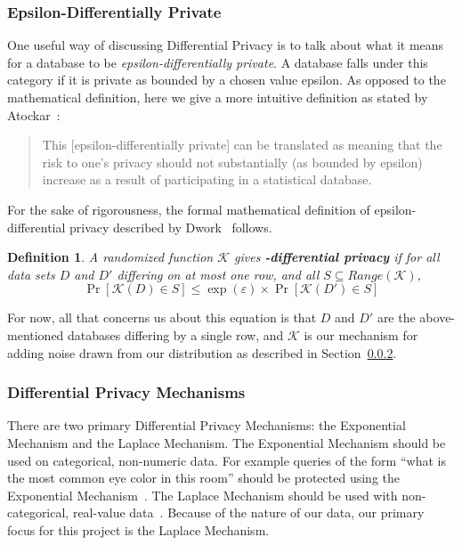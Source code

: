 \documentclass[conference,11pt]{IEEEtran}
\newtheorem{definition}{Definition}
\begin{document}
\subsubsection{Epsilon-Differentially Private}\label{sec:epsilon-dp}
One useful way of discussing Differential Privacy is to talk about what it means
for a database to be \textit{epsilon-differentially private}. A database falls
under this category if it is private as bounded by a chosen value epsilon. As
opposed to the mathematical definition, here we give a more intuitive definition
as stated by Atockar~\cite{Atockar:2014}:

\blockquote{%
    This [epsilon-differentially private] can be translated as meaning that the
    risk to one's privacy should not substantially (as bounded by epsilon)
    increase as a result of participating in a statistical database.
}

For the sake of rigorousness, the formal mathematical definition of
epsilon-differential privacy described by Dwork~\cite{Dwork:2006:DP} follows.

\begin{mdframed}
    \begin{definition}
        A randomized function $\mathcal{K}$ gives
        \textbf{\textepsilon-differential privacy} if for all data sets $D$ and
        $D'$ differing on at most one row, and all $S \subseteq
        Range(\mathcal{K})$,
        \begin{equation}
            \Pr[\mathcal{K}(D) \in S] \leq \exp(\varepsilon) \times
            \Pr[\mathcal{K}(D') \in S]
        \end{equation}
    \end{definition}
\end{mdframed}

For now, all that concerns us about this equation is that $D$ and $D'$ are the
above-mentioned databases differing by a single row, and $\mathcal{K}$ is our
mechanism for adding noise drawn from our distribution as described in
Section~\ref{sec:dp-mech}.

\subsubsection{Differential Privacy Mechanisms}\label{sec:dp-mech}
There are two primary Differential Privacy Mechanisms: the Exponential Mechanism
and the Laplace Mechanism. The Exponential Mechanism should be used on
categorical, non-numeric data. For example queries of the form ``what is the
most common eye color in this room'' should be protected using the Exponential
Mechanism~\cite{Atockar:2014}. The Laplace Mechanism should be used with
non-categorical, real-value data~\cite{Geng:2014}. Because of the nature of our
data, our primary focus for this project is the Laplace Mechanism.
\end{document}
